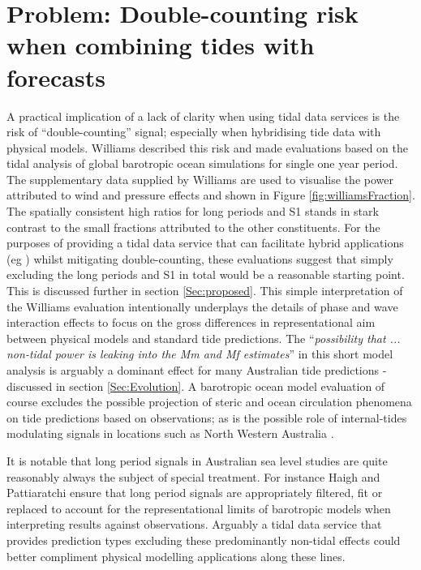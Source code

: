 \section{Problem: Double-counting risk when combining tides with forecasts}
\label{Sec:DoubleCount}
A practical implication of a lack of clarity when using tidal data services is the risk of ``double-counting'' signal; especially when hybridising tide data with physical models. 
Williams \cite{10.5194/os-2020-107} described this risk and made evaluations based on the tidal analysis of global barotropic ocean simulations for single one year period. 
The supplementary data supplied by Williams are used to visualise the power attributed to wind and pressure effects and shown in Figure \ref{fig:williamsFraction}.  The spatially consistent high ratios for long periods and S1 stands in stark contrast to the small fractions attributed to the other constituents.    
For the purposes of providing a tidal data service that can facilitate hybrid applications (eg \cite{Taylor:2017coa}) whilst mitigating double-counting, these evaluations suggest that simply excluding the long periods and S1 in total would be a reasonable starting point.   This is discussed further in  section \ref{Sec:proposed}.
This simple interpretation of the Williams evaluation intentionally underplays the details of phase and wave interaction effects to focus on the gross differences in representational aim between physical models and standard tide predictions. 
The ``\textit{possibility that ... non-tidal power is leaking into the Mm and Mf estimates}'' in this short model analysis is arguably a dominant effect for many Australian tide predictions - discussed in section \ref{Sec:Evolution}.
A barotropic ocean model evaluation of course excludes the possible projection of steric and ocean circulation phenomena on tide predictions based on observations; as is the possible role of internal-tides modulating signals in locations such as North Western Australia \citep{10.3389/fmars.2021.629372}.

It is notable that long period signals in Australian sea level studies are quite reasonably always the subject of special treatment. For instance Haigh \cite{Haigh:2013bn} and Pattiaratchi \cite{10.1074/mcp.s800908-mcp200} ensure that long period signals are appropriately filtered, fit or replaced to account for the representational limits of barotropic models when interpreting results against observations.
Arguably a tidal data service that provides prediction types excluding these  predominantly non-tidal effects could better compliment physical modelling applications along these lines. 


